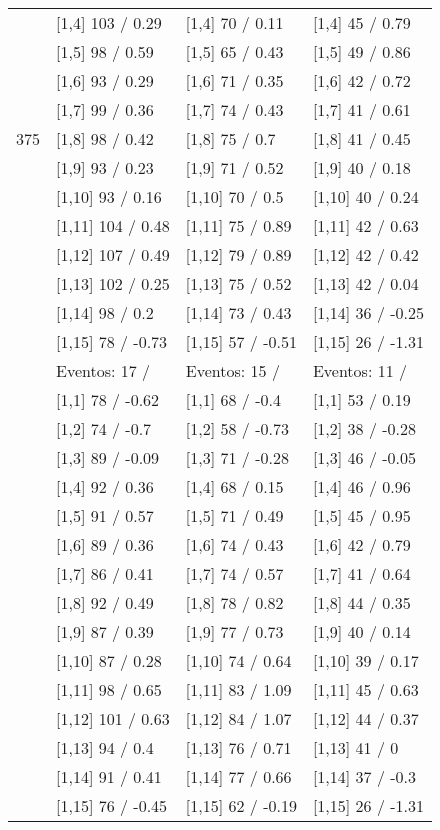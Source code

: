 \begin{table}
\begin{tabular}[t]{llll}
 & {}[1,4] 103  / 0.29 & {}[1,4] 70  / 0.11 & {}[1,4] 45  / 0.79\\
 & {}[1,5] 98  / 0.59 & {}[1,5] 65  / 0.43 & {}[1,5] 49  / 0.86\\
 & {}[1,6] 93  / 0.29 & {}[1,6] 71  / 0.35 & {}[1,6] 42  / 0.72\\
 & {}[1,7] 99  / 0.36 & {}[1,7] 74  / 0.43 & {}[1,7] 41  / 0.61\\
375 & {}[1,8] 98  / 0.42 & {}[1,8] 75  / 0.7 & {}[1,8] 41  / 0.45\\
\addlinespace
 & {}[1,9] 93  / 0.23 & {}[1,9] 71  / 0.52 & {}[1,9] 40  / 0.18\\
 & {}[1,10] 93  / 0.16 & {}[1,10] 70  / 0.5 & {}[1,10] 40  / 0.24\\
 & {}[1,11] 104  / 0.48 & {}[1,11] 75  / 0.89 & {}[1,11] 42  / 0.63\\
 & {}[1,12] 107  / 0.49 & {}[1,12] 79  / 0.89 & {}[1,12] 42  / 0.42\\
 & {}[1,13] 102  / 0.25 & {}[1,13] 75  / 0.52 & {}[1,13] 42  / 0.04\\
\addlinespace
 & {}[1,14] 98  / 0.2 & {}[1,14] 73  / 0.43 & {}[1,14] 36  / -0.25\\
 & {}[1,15] 78  / -0.73 & {}[1,15] 57  / -0.51 & {}[1,15] 26  / -1.31\\
 & Eventos:  17 / & Eventos:  15 / & Eventos:  11 /\\
 & {}[1,1] 78  / -0.62 & {}[1,1] 68  / -0.4 & {}[1,1] 53  / 0.19\\
 & {}[1,2] 74  / -0.7 & {}[1,2] 58  / -0.73 & {}[1,2] 38  / -0.28\\
\addlinespace
 & {}[1,3] 89  / -0.09 & {}[1,3] 71  / -0.28 & {}[1,3] 46  / -0.05\\
 & {}[1,4] 92  / 0.36 & {}[1,4] 68  / 0.15 & {}[1,4] 46  / 0.96\\
 & {}[1,5] 91  / 0.57 & {}[1,5] 71  / 0.49 & {}[1,5] 45  / 0.95\\
 & {}[1,6] 89  / 0.36 & {}[1,6] 74  / 0.43 & {}[1,6] 42  / 0.79\\
 & {}[1,7] 86  / 0.41 & {}[1,7] 74  / 0.57 & {}[1,7] 41  / 0.64\\
\addlinespace
500 & {}[1,8] 92  / 0.49 & {}[1,8] 78  / 0.82 & {}[1,8] 44  / 0.35\\
 & {}[1,9] 87  / 0.39 & {}[1,9] 77  / 0.73 & {}[1,9] 40  / 0.14\\
 & {}[1,10] 87  / 0.28 & {}[1,10] 74  / 0.64 & {}[1,10] 39  / 0.17\\
 & {}[1,11] 98  / 0.65 & {}[1,11] 83  / 1.09 & {}[1,11] 45  / 0.63\\
 & {}[1,12] 101  / 0.63 & {}[1,12] 84  / 1.07 & {}[1,12] 44  / 0.37\\
\addlinespace
 & {}[1,13] 94  / 0.4 & {}[1,13] 76  / 0.71 & {}[1,13] 41  / 0\\
 & {}[1,14] 91  / 0.41 & {}[1,14] 77  / 0.66 & {}[1,14] 37  / -0.3\\
 & {}[1,15] 76  / -0.45 & {}[1,15] 62  / -0.19 & {}[1,15] 26  / -1.31\\
\bottomrule
\end{tabular}
\end{table}

